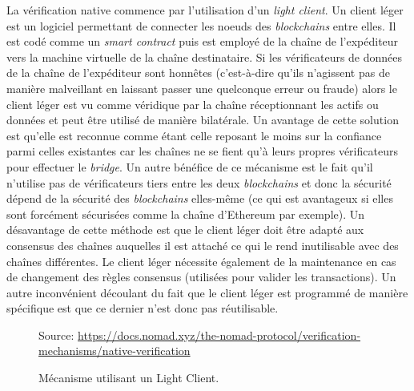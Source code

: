  La vérification native commence par l’utilisation d’un \textit{light client}\cite{NomadDocsNative}. Un client léger est un logiciel permettant de connecter les noeuds des \textit{blockchains} entre elles. Il est codé comme un \textit{smart contract} puis est employé de la chaîne de l'expéditeur vers la machine virtuelle de la chaîne destinataire. Si les vérificateurs de données de la chaîne de l'expéditeur sont honnêtes (c’est-à-dire qu’ils n’agissent pas de manière malveillant en laissant passer une quelconque erreur ou fraude) alors le client léger est vu comme véridique par la chaîne réceptionnant les actifs ou données et peut être utilisé de manière bilatérale.
 Un avantage de cette solution est qu’elle est reconnue comme étant celle reposant le moins sur la confiance parmi celles existantes car les chaînes ne se fient qu’à leurs propres vérificateurs pour effectuer le \textit{bridge}. Un autre bénéfice de ce mécanisme est le fait qu’il n’utilise pas de vérificateurs tiers entre les deux \textit{blockchains} et donc la sécurité dépend de la sécurité des \textit{blockchains} elles-même (ce qui est avantageux si elles sont forcément sécurisées comme la chaîne d’Ethereum par exemple).
 Un désavantage de cette méthode est que le client léger doit être adapté aux consensus des chaînes auquelles il est attaché ce qui le rend inutilisable avec des chaînes différentes. Le client léger nécessite également de la maintenance en cas de changement des règles consensus (utilisées pour valider les transactions). Un autre inconvénient découlant du fait que le client léger est programmé de manière spécifique est que ce dernier n’est donc pas réutilisable. \\

 \begin{figure}[h!]
    \centering

    {\scriptsize
            Source: \url{https://docs.nomad.xyz/the-nomad-protocol/verification-mechanisms/native-verification}}
    \caption{Mécanisme utilisant un Light Client.}
    \label{fig:LightClient}
\end{figure}

